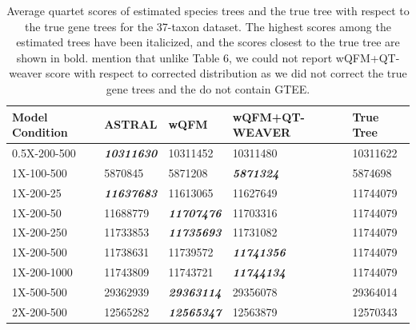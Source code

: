 \documentclass[10pt,a4paper]{article}
\newcommand{\addb}[1]{{\color{red} #1}}
\begin{document}
\begin{table}[h!]
    \centering
    \caption{Average quartet scores of estimated species trees and the true tree with respect to the true gene trees for the 37-taxon dataset. The highest scores among the estimated trees have been italicized, and the scores closest to the true tree are shown in bold. \addb{mention that unlike Table 6, we could not report wQFM+QT-weaver score with respect to corrected distribution as we did not correct the true gene trees and the do not contain GTEE.}}
    \label{tab:37-quartet-scores-true}
    \begin{tabular}{|C{2.3cm}|C{3cm}|C{3cm}|C{3cm}|C{3cm}|}
        \hline
        \textbf{Model Condition} & \textbf{ASTRAL} & \textbf{wQFM} & \textbf{wQFM+QT-WEAVER} & \textbf{True Tree} \\
        \hline \hline
        0.5X-200-500 & \textbf{\textit{10311630}} & 10311452 & 10311480 & 10311622 \\
        \hline
        1X-100-500 & 5870845 & 5871208 & \textbf{\textit{5871324}} & 5874698 \\
        \hline
        1X-200-25 & \textbf{\textit{11637683}} & 11613065 & 11627649 & 11744079 \\
        \hline
        1X-200-50 & 11688779 & \textbf{\textit{11707476}} & 11703316 & 11744079 \\
        \hline
        1X-200-250 & 11733853 & \textbf{\textit{11735693}} & 11731082 & 11744079 \\
        \hline
        1X-200-500 & 11738631 & 11739572 & \textbf{\textit{11741356}} & 11744079 \\
        \hline
        1X-200-1000 & 11743809 & 11743721 & \textbf{\textit{11744134}} & 11744079 \\
        \hline
        1X-500-500 & 29362939 & \textbf{\textit{29363114}} & 29356078 & 29364014 \\
        \hline
        2X-200-500 & 12565282 & \textbf{\textit{12565347}} & 12563879 & 12570343 \\
        \hline
    \end{tabular}
\end{table}


\end{document}
